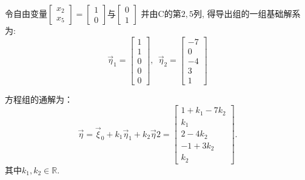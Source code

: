 \begin{eg}
令自由变量$\begin{bmatrix}x_2\\ x_5\end{bmatrix}=\begin{bmatrix}1\\0\end{bmatrix}$与$\begin{bmatrix}0\\1\end{bmatrix}$ 并由C的第$2,5$列, 得导出组的一组基础解系为:
\begin{displaymath}
\vec{\eta}_1=\begin{bmatrix}1\\1\\0\\0\\0\end{bmatrix},\ \ \vec{\eta}_2=\begin{bmatrix}-7\\0\\-4\\3\\1\end{bmatrix}
\end{displaymath}

方程组的通解为：
\begin{displaymath}
\vec{\eta}=\vec{\xi}_0+k_1\vec{\eta}_1+k_2\vec{\eta}2=\begin{bmatrix}
1+k_1-7k_2\\k_1\\2-4k_2\\-1+3k_2\\k_2\end{bmatrix}.
\end{displaymath}
其中$k_1,k_2\in\mathbb{R}$.

\end{eg}

